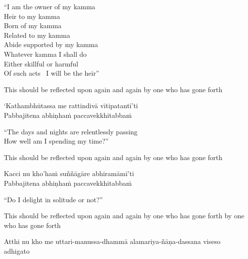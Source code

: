 \begin{english}
  ``I am the owner of my kamma\\
  Heir to my kamma\\
  Born of my kamma\\
  Related to my kamma\\
  Abide supported by my kamma\\
  Whatever kamma I shall do\\
  Either skillful or harmful\\
  Of such acts \breathmark\ I will be the heir''\hyperlink{endnote101-appendix}{\hypertarget{endnote101-body}{}}\\
\begin{english-hangtogether}
  This should be reflected upon again and again by one who has gone forth
\end{english-hangtogether}
\end{english}

`Kathambhūtassa me rattindivā vītipatantī'ti\\
Pabbajitena abhiṇhaṁ paccavekkhitabbaṁ

\begin{english}
  ``The days and nights are relentlessly passing\\
  How well am I spending my time?''
\begin{english-hangtogether}
  This should be reflected upon again and again by one who has gone forth
\end{english-hangtogether}
\end{english}

Kacci nu kho'haṁ suññāgāre abhiramāmī'ti\\
Pabbajitena abhiṇhaṁ paccavekkhitabbaṁ

\begin{english}
  ``Do I delight in solitude or not?''
\begin{english-hangtogether}
  This should be reflected upon again and again by one who has gone forth by one who has gone forth
\end{english-hangtogether}
\end{english}

\begin{pali-hang}
Atthi nu kho me uttari-manussa-dhammā alamariya-ñāṇa-dassana viseso adhigato\\
\end{pali-hang}

